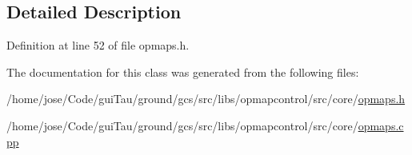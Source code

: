 \subsection{Detailed Description}


Definition at line 52 of file opmaps.\-h.



The documentation for this class was generated from the following files\-:\begin{DoxyCompactItemize}
\item 
/home/jose/\-Code/gui\-Tau/ground/gcs/src/libs/opmapcontrol/src/core/\hyperlink{opmaps_8h}{opmaps.\-h}\item 
/home/jose/\-Code/gui\-Tau/ground/gcs/src/libs/opmapcontrol/src/core/\hyperlink{opmaps_8cpp}{opmaps.\-cpp}\end{DoxyCompactItemize}
